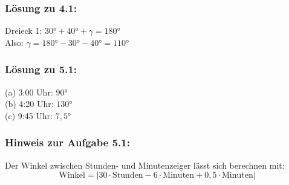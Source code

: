 \begin{multicols}{2}
\subsubsection*{Lösung zu 4.1:}
Dreieck 1: $30° + 40° + \gamma = 180°$\\
Also: $\gamma = 180° - 30° - 40° = 110°$

\columnbreak

\subsubsection*{Lösung zu 5.1:}
(a) 3:00 Uhr: $90°$\\
(b) 4:20 Uhr: $130°$\\
(c) 9:45 Uhr: $7,5°$
\end{multicols}

\subsubsection*{Hinweis zur Aufgabe 5.1:}
Der Winkel zwischen Stunden- und Minutenzeiger lässt sich berechnen mit:
$$ \text{Winkel} = \left| 30 \cdot \text{Stunden} - 6 \cdot \text{Minuten} + 0,5 \cdot \text{Minuten} \right| $$
